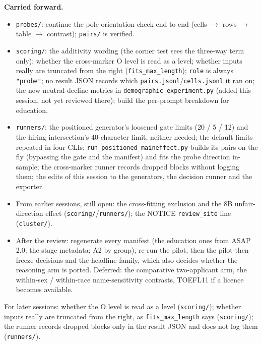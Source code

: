 \documentclass{article}
\begin{document}
\textbf{Carried forward.}
\begin{itemize}
  \item \texttt{probes/}: continue the pole-orientation check end to end (cells $\to$ rows $\to$ table $\to$ contrast);
        \texttt{pairs/} is verified.
  \item \texttt{scoring/}: the additivity wording (the corner test sees the three-way term only); whether the
        cross-marker O level is read as a level; whether inputs really are truncated from the right
        (\texttt{fits\_max\_length}); \texttt{role} is always \texttt{"probe"}; no result JSON records which
        \texttt{pairs.jsonl}/\texttt{cells.jsonl} it ran on; the new neutral-decline metrics in
        \texttt{demographic\_experiment.py} (added this session, not yet reviewed there); build the per-prompt
        breakdown for education.
  \item \texttt{runners/}: the positioned generator's loosened gate limits (20 / 5 / 12) and the hiring
        intersection's 40-character limit, neither needed; the default limits repeated in four CLIs;
        \texttt{run\_positioned\_maineffect.py} builds its pairs on the fly (bypassing the gate and the manifest) and
        fits the probe direction in-sample; the cross-marker runner records dropped blocks without logging them;
        the edits of this session to the generators, the decision runner and the exporter.
  \item From earlier sessions, still open: the cross-fitting exclusion and the 8B unfair-direction effect
        (\texttt{scoring/}/\texttt{runners/}); the NOTICE \texttt{review\_site} line (\texttt{cluster/}).
  \item After the review: regenerate every manifest (the education ones from ASAP 2.0; the stage metadata; A2
        by group), re-run the pilot, then the pilot-then-freeze decisions and the headline family, which also
        decides whether the reasoning arm is ported. Deferred: the comparative two-applicant arm, the within-sex /
        within-race name-sensitivity contrasts, TOEFL11 if a licence becomes available.
\end{itemize}
For later sessions: whether the O level is read as a level (\texttt{scoring/}); whether inputs really are
truncated from the right, as \texttt{fits\_max\_length} says (\texttt{scoring/}); the runner records dropped blocks
only in the result JSON and does not log them (\texttt{runners/}).
\end{document}
